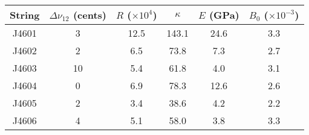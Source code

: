 \begin{tabular}{cccccc}
\toprule
String &  $\Delta \nu_{12}$ (cents) &  $R$ ($\times 10^4$) &  $\kappa$ &  $E$ (GPa) &  $B_0$ ($\times 10^{-3}$) \\
\midrule
 J4601 &                          3 &                 12.5 &     143.1 &       24.6 &                       3.3 \\
 J4602 &                          2 &                  6.5 &      73.8 &        7.3 &                       2.7 \\
 J4603 &                         10 &                  5.4 &      61.8 &        4.0 &                       3.1 \\
 J4604 &                          0 &                  6.9 &      78.3 &       12.6 &                       2.6 \\
 J4605 &                          2 &                  3.4 &      38.6 &        4.2 &                       2.2 \\
 J4606 &                          4 &                  5.1 &      58.0 &        3.8 &                       3.3 \\
\bottomrule
\end{tabular}

